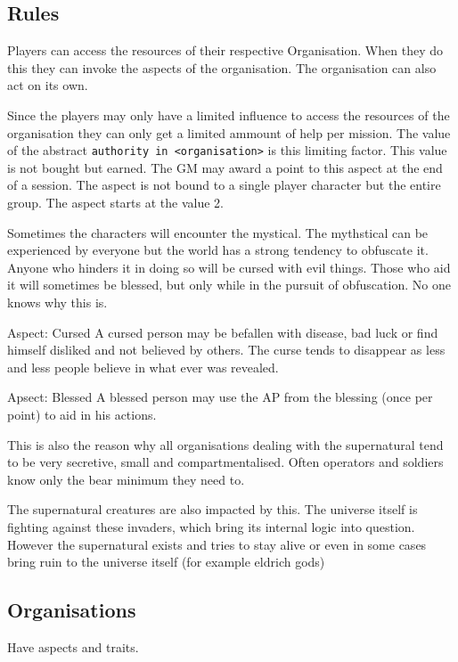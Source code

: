 \documentclass[11pt]{article}
\begin{document}
{\subsection{Rules}
\label{sec:orgb1e7ebd}

Players can access the resources of their respective Organisation. When they do this they can invoke the aspects of the organisation. The organisation can also act on its own.

Since the players may only have a limited influence to access the resources of the organisation they can only get a limited ammount of help per mission. The value of the abstract \texttt{authority in <organisation>}  is this limiting factor. This value is not bought but earned. The GM may award a point to this aspect at the end of a session. The aspect is not bound to a single player character but the entire group. The aspect starts at the value 2. 



Sometimes the characters will encounter the mystical. The mythstical can be experienced by everyone but the world has a strong tendency to obfuscate it. Anyone who hinders it in doing so will be cursed with evil things. Those who aid it will sometimes be blessed, but only while in the pursuit of obfuscation. No one knows why this is.

Aspect: Cursed
A cursed person may be befallen with disease, bad luck or find himself disliked and not believed by others. The curse tends to disappear as less and less people believe in what ever was revealed.

Apsect: Blessed
A blessed person may use the AP from the blessing (once per point) to aid in his actions. 

This is also the reason why all organisations dealing with the supernatural tend to be very secretive, small and compartmentalised. Often operators and soldiers know only the bear minimum they need to. 

The supernatural creatures are also impacted by this. The universe itself is fighting against these invaders, which bring its internal logic into question. However the supernatural exists and tries to stay alive or even in some cases bring ruin to the universe itself (for example eldrich gods)

\subsection{Organisations}
\label{sec:org5eb6180}
Have aspects and traits.

}
\end{document}
